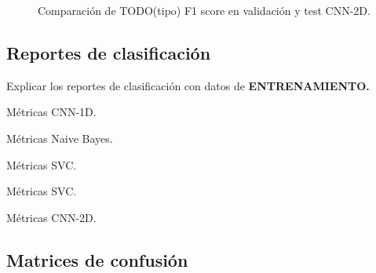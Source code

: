     \begin{figure}[h]
        \centering
        
        \caption{Comparación de TODO(tipo) F1 score en validación y test CNN-2D.}
        \label{F1Score2DImage}
     \end{figure}


  \subsection{Reportes de clasificación}
       
    Explicar los reportes de clasificación con datos de \textbf{ENTRENAMIENTO.}

      \begin{table}[H]
        \centering
        \caption{Métricas CNN-1D.}
        \label{CNN1DMetrics}
      \end{table}

      \begin{table}[H]
        \centering
        \caption{Métricas Naive Bayes.}
        \label{NBMetrics}
      \end{table}

      \begin{table}[H]
        \centering
        \caption{Métricas SVC.}
        \label{SVCDMetrics}
      \end{table}

      \begin{table}[H]
        \centering
        \caption{Métricas SVC.}
        \label{SVCDMetrics}
      \end{table}

      \begin{table}[H]
        \centering
        \caption{Métricas CNN-2D.}
        \label{CNN2DMetrics}
      \end{table}



  \subsection{Matrices de confusión}


